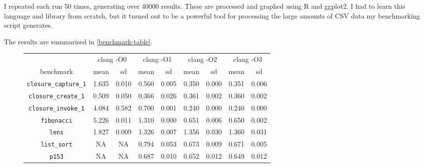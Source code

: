 \documentclass[12pt,a4paper,twoside,openright]{report}
\begin{document}
I repeated each run 50 times, generating over 40000 results. These are
processed and graphed using R and ggplot2. I had to learn this language and
library from scratch, but it turned out to be a powerful tool for processing
the large amounts of CSV data my benchmarking script generates.

The results are summarised in \ref{benchmark-table}.

\begin{figure}[h]
  \centering
  \small
\begin{tabular}{| c | c c | c c | c c | c c |}
  \hline
  & \multicolumn{2}{c|}{clang -O0}
  & \multicolumn{2}{c|}{clang -O1}
  & \multicolumn{2}{c|}{clang -O2}
  & \multicolumn{2}{c|}{clang -O3}
  \\
benchmark                     & mean  & sd    & mean  & sd    & mean  & sd    & mean  & sd \\
  \hline
\lstinline!closure_capture_1! & \cellcolor[hsb]{0.3,0.097,1}1.635 & 0.010 & \cellcolor[hsb]{0.3,0.691,1}0.560 & 0.005 & \cellcolor[hsb]{0.3,0.807,1}0.350 & 0.000 & \cellcolor[hsb]{0.3,0.806,1}0.351 & 0.006 \\
\lstinline!closure_create_1!  & \cellcolor[hsb]{0.0,1.000,1}0.509 & 0.050 & \cellcolor[hsb]{0.0,0.642,1}0.366 & 0.026 & \cellcolor[hsb]{0.0,0.626,1}0.361 & 0.002 & \cellcolor[hsb]{0.0,0.625,1}0.360 & 0.002 \\
\lstinline!closure_invoke_1!  & \cellcolor[hsb]{0.0,0.432,1}4.084 & 0.582 & \cellcolor[hsb]{0.3,0.680,1}0.700 & 0.001 & \cellcolor[hsb]{0.3,0.890,1}0.240 & 0.000 & \cellcolor[hsb]{0.3,0.890,1}0.240 & 0.000 \\
\lstinline!fibonacci!         & \cellcolor[hsb]{0.0,0.326,1}5.226 & 0.011 & \cellcolor[hsb]{0.3,0.586,1}1.310 & 0.000 & \cellcolor[hsb]{0.3,0.794,1}0.651 & 0.006 & \cellcolor[hsb]{0.3,0.794,1}0.650 & 0.002 \\
\lstinline!lens!              & \cellcolor[hsb]{0.0,1.000,1}1.827 & 0.009 & \cellcolor[hsb]{0.0,1.000,1}1.326 & 0.007 & \cellcolor[hsb]{0.0,1.000,1}1.356 & 0.030 & \cellcolor[hsb]{0.0,1.000,1}1.360 & 0.031 \\
\lstinline!list_sort!         &                                NA &    NA & \cellcolor[hsb]{0.3,0.292,1}0.794 & 0.053 & \cellcolor[hsb]{0.3,0.400,1}0.673 & 0.009 & \cellcolor[hsb]{0.0,0.402,1}0.671 & 0.005 \\
\lstinline!p153!              &                                NA &    NA & \cellcolor[hsb]{0.0,0.357,1}0.687 & 0.010 & \cellcolor[hsb]{0.0,0.314,1}0.652 & 0.012 & \cellcolor[hsb]{0.0,0.310,1}0.649 & 0.012 \\

\end{tabular}
\end{figure}
\end{document}
